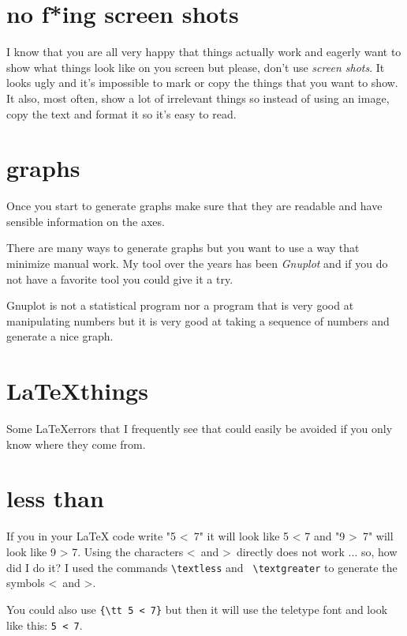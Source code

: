 \documentclass[a4paper,11pt]{article}
\begin{document}
\section*{no f*ing screen shots}

I know that you are all very happy that things actually work and
eagerly want to show what things look like on you screen but please,
don't use {\em screen shots}. It looks ugly and it's impossible to mark or
copy the things that you want to show. It also, most often, show a lot
of irrelevant things so instead of using an image, copy the text and
format it so it's easy to read.

\section*{graphs}

Once you start to generate graphs make sure that they are readable and
have sensible information on the axes. 

There are many ways to generate graphs but you want to
use a way that minimize manual work. My tool over the years has been
{\em Gnuplot} and if you do not have a favorite tool you could give it
a try.

Gnuplot is not a statistical program nor a program that is very good at
manipulating numbers but it is very good at taking a sequence of
numbers and generate a nice graph.

\section*{\LaTeX things}

Some \LaTeX errors that I frequently see that could easily be avoided
if you only know where they come from.

\section*{less than}

If you in your LaTeX code write "5 \textless\ 7" it will look like 5 <
7 and "9 \textgreater\ 7" will look like 9 > 7. Using the characters
\textless\ and \textgreater\ directly does not work ... so, how did I
do it?  I used the commands {\tt  \textbackslash textless} and {\tt
  \textbackslash textgreater} to generate the symbols \textless\ and
\textgreater.

You could also use {\tt \{\textbackslash tt 5 < 7\}} but then it
will use the teletype font and look like this: {\tt 5 < 7}.
\end{document}

